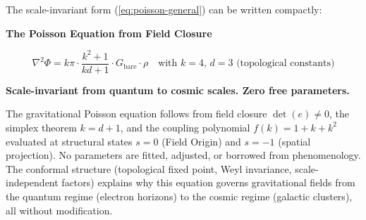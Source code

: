 The scale-invariant form (\ref{eq:poisson-general}) can be written compactly:

\vspace{1.5em}
\noindent
\colorbox{resultgreen}{\parbox{\dimexpr\textwidth-2\fboxsep\relax}{%
\vspace{0.8em}
\centering
\textbf{\large The Poisson Equation from Field Closure}

\vspace{0.5em}
\boldmath
\begin{equation}
\nabla^2\Phi = k\pi \cdot \frac{k^2+1}{kd+1} \cdot G_{\text{bare}} \cdot \rho
\quad \text{with } k=4, \, d=3 \text{ (topological constants)}
\label{eq:poisson-boxed}
\end{equation}
\unboldmath

\vspace{0.3em}
\textbf{Scale-invariant from quantum to cosmic scales. Zero free parameters.}
\vspace{0.5em}}}
\vspace{1.5em}

The gravitational Poisson equation follows from field closure $\det(e) \neq 0$, the simplex theorem $k = d+1$, and the coupling polynomial $f(k) = 1 + k + k^2$ evaluated at structural states $s=0$ (Field Origin) and $s=-1$ (spatial projection). No parameters are fitted, adjusted, or borrowed from phenomenology. The conformal structure (topological fixed point, Weyl invariance, scale-independent factors) explains why this equation governs gravitational fields from the quantum regime (electron horizons) to the cosmic regime (galactic clusters), all without modification.
